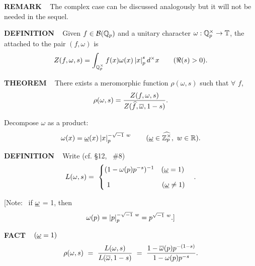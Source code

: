 \begin{x}{\small\bf REMARK} \ %
The complex case can be discussed analogously but it will not be needed in the sequel.
\\
\end{x}

\vspace{0.1cm}

\begin{x}{\small\bf DEFINITION} \ %
Given $f \in \mathcal{B}(\mathbb{Q}_p)$ and a unitary character $\omega:\mathbb{Q}_p^\times \rightarrow \mathbb{T}$, 
the 
attached to the pair $(f,\omega)$ is
\[
Z(f,\omega,s) = \int_{\mathbb{Q}_p^\times} f(x) \omega(x) \left\vert x\right\vert_p^s d^\times x \qquad (\Re (s) > 0).
\]
\end{x}

\vspace{0.1cm}

\begin{x}{\small\bf THEOREM} \ %
There exists a meromorphic function $\rho(\omega,s)$ such that $\forall$ $f$,
\[
\rho(\omega,s) = \frac{Z(f,\omega,s) }{Z(\widehat{f},\overline{\omega},1-s) }.
\]

Decompose $\omega$ as a product:
\[
\omega(x) = \underline{\omega}(x) \left\vert x\right\vert_p^{-\sqrt{-1} \ w} \qquad (\underline{\omega} \in \widehat{\mathbb{Z}_p^\times}, \ w \in \mathbb{R}).
\]
\end{x}

\vspace{0.1cm}

\begin{x}{\small\bf DEFINITION} \ %
Write (cf. \S12, \ \#8)
\[
L(\omega,s) =\ 
\begin{cases}
(1 - \omega(p)p^{-s})^{-1}   \quad (\un{\omega} = 1)
\vspace{0.25cm}\\
\ 1  \  \quad \quad \quad \quad \quad \quad \quad (\un{\omega} \ne 1)
\end{cases}
.\]

[Note: \  if $\underline{\omega}$ = 1, then
\[
\omega(p) = \left\vert p\right\vert_p^{-\sqrt{-1}\ w} = p^{\sqrt{-1}\ w}.]
\]
\end{x}

\vspace{0.1cm}

\vspace{0.15cm}
\begin{x}{\small\bf FACT} \ %
$(\underline{\omega} = 1)$
\[
\rho(\omega,s) \ = \  \frac{L(\omega,s) }{L(\overline{\omega},1-s)} \ = \  \frac{1 - \overline{\omega}(p)p^{-(1-s)}}{1 - \omega(p)p^{-s}}.
\]
\end{x}


